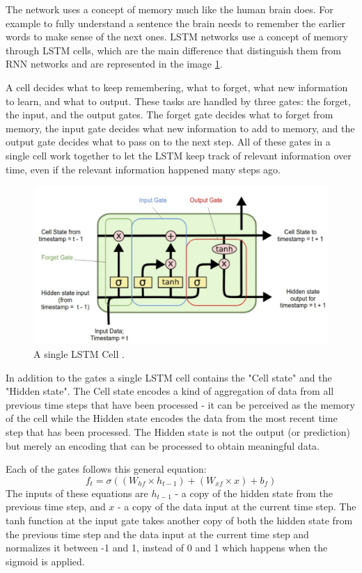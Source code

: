 The network uses a concept of memory much like the human brain does. For example to fully understand a sentence the brain needs to remember the earlier words to make sense of the next ones.
LSTM networks use a concept of memory through LSTM cells, which are the main difference that distinguish them from RNN networks and are represented in the image \ref{fig:lstm_cell}.

A cell decides what to keep remembering, what to forget, what new information to learn, and what to output. These tasks are handled by three gates: the forget, the input, and the output gates. The forget gate decides what to forget from memory, the input gate decides what new information to add to memory, and the output gate decides what to pass on to the next step. All of these gates in a single cell work together to let the LSTM keep track of relevant information over time, even if the relevant information happened many steps ago.

\begin{figure}[h!]
    \centering
    \includegraphics[width=0.8\linewidth]{images/lstm_cell.png}
    \caption{A single LSTM Cell \cite{medium_lstm}.}
    \label{fig:lstm_cell}
\end{figure}

In addition to the gates a single LSTM cell contains the "Cell state" and the "Hidden state". The Cell state encodes a kind of aggregation of data from all previous time steps that have been processed - it can be perceived as the memory of the cell while the Hidden state encodes the data from the most recent time step that has been processed. The Hidden state is not the output (or prediction) but merely an encoding that can be processed to obtain meaningful data.

Each of the gates follows this general equation:
\[f_t = \sigma((W_{hf}\times h_{t-1}) + (W_{xf} \times x) + b_f)\]
The inputs of these equations are \(h_{t-1}\) - a copy of the hidden state from the previous time step, and \(x\) - a copy of the data input at the current time step. The tanh function at the input gate takes another copy of both the hidden state from the previous time step and the data input at the current time step and normalizes it between -1 and 1, instead of 0 and 1 which happens when the sigmoid is applied. 

